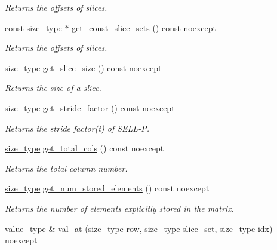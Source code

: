 \begin{DoxyCompactItemize}
\begin{DoxyCompactList}\small\item\em Returns the offsets of slices. \end{DoxyCompactList}\item 
const \hyperlink{namespacegko_a6e5c95df0ae4e47aab2f604a22d98ee7}{size\+\_\+type} $\ast$ \hyperlink{classgko_1_1matrix_1_1Sellp_a1b5bcac41afe4dee75994ad05c1ffc81}{get\+\_\+const\+\_\+slice\+\_\+sets} () const noexcept
\begin{DoxyCompactList}\small\item\em Returns the offsets of slices. \end{DoxyCompactList}\item 
\hyperlink{namespacegko_a6e5c95df0ae4e47aab2f604a22d98ee7}{size\+\_\+type} \hyperlink{classgko_1_1matrix_1_1Sellp_a0554e79b672f35df5dd01cb467850227}{get\+\_\+slice\+\_\+size} () const noexcept
\begin{DoxyCompactList}\small\item\em Returns the size of a slice. \end{DoxyCompactList}\item 
\hyperlink{namespacegko_a6e5c95df0ae4e47aab2f604a22d98ee7}{size\+\_\+type} \hyperlink{classgko_1_1matrix_1_1Sellp_a34c7942cac3db5a9c4c0b609d2a5540b}{get\+\_\+stride\+\_\+factor} () const noexcept
\begin{DoxyCompactList}\small\item\em Returns the stride factor(t) of S\+E\+L\+L-\/P. \end{DoxyCompactList}\item 
\hyperlink{namespacegko_a6e5c95df0ae4e47aab2f604a22d98ee7}{size\+\_\+type} \hyperlink{classgko_1_1matrix_1_1Sellp_a3e5ca0f4968f29f97b5a42aac4d08b3d}{get\+\_\+total\+\_\+cols} () const noexcept
\begin{DoxyCompactList}\small\item\em Returns the total column number. \end{DoxyCompactList}\item 
\hyperlink{namespacegko_a6e5c95df0ae4e47aab2f604a22d98ee7}{size\+\_\+type} \hyperlink{classgko_1_1matrix_1_1Sellp_aab92660b6249e243e3ad35a51c557f3b}{get\+\_\+num\+\_\+stored\+\_\+elements} () const noexcept
\begin{DoxyCompactList}\small\item\em Returns the number of elements explicitly stored in the matrix. \end{DoxyCompactList}\item 
value\+\_\+type \& \hyperlink{classgko_1_1matrix_1_1Sellp_a0654ed1e0f066c8b9a15aaaeeea34030}{val\+\_\+at} (\hyperlink{namespacegko_a6e5c95df0ae4e47aab2f604a22d98ee7}{size\+\_\+type} row, \hyperlink{namespacegko_a6e5c95df0ae4e47aab2f604a22d98ee7}{size\+\_\+type} slice\+\_\+set, \hyperlink{namespacegko_a6e5c95df0ae4e47aab2f604a22d98ee7}{size\+\_\+type} idx) noexcept

\end{DoxyCompactItemize}
